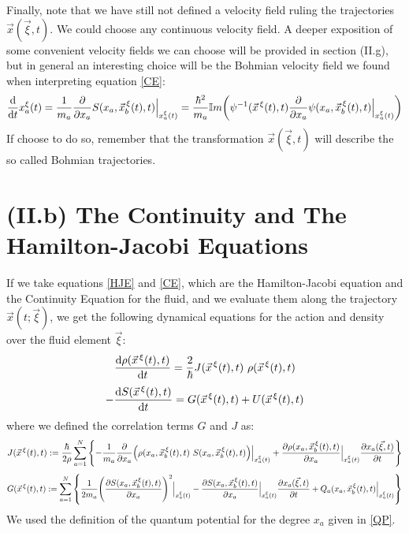\documentclass[11pt, a4paper]{article} %
\begin{document}
Finally, note that we have still not defined a velocity field ruling the trajectories $\vec{x}(\vec{\xi},t)$. We could choose any continuous velocity field. A deeper exposition of some convenient velocity fields we can choose will be provided in section (II.g), but in general an interesting choice will be the Bohmian velocity field we found when interpreting equation \eqref{CE}:
\begin{equation}\label{ImpBohm}
\dv{}{t}x_a^\xi(t)=\frac{1}{m_a}\pdv{}{x_a}S(x_a, \vec{x}_b^{\, \xi}(t),t)\Big\rvert_{x^\xi_a(t)}=\frac{\hbar^2}{m_a}\mathbb{I}m \qty( \psi^{-1}(\vec{x}^{\, \xi}(t),t)\pdv{}{x_a}\psi(x_a, \vec{x}_b^{\, \xi}(t),t)\Big\rvert_{x^\xi_a(t)})
\end{equation}
 If choose to do so, remember that the transformation $\vec{x}(\vec{\xi},t)$ will describe the so called Bohmian trajectories.
\newpage
\section*{(II.b) The Continuity and The Hamilton-Jacobi Equations\vspace{-0.3cm}}

If we take equations \eqref{HJE} and \eqref{CE}, which are the Hamilton-Jacobi equation and the Continuity Equation for the fluid, and we evaluate them along the trajectory $\vec{x}(t;\vec{\xi})$, we get the following dynamical equations for the action and density over the fluid element $\vec{\xi}$:
\begin{equation}\label{CE.L}
\dv{\rho(\vec{x}^{\, \xi}(t),t)}{t}=\frac{2}{\hbar}J(\vec{x}^{\, \xi}(t),t)\ \rho(\vec{x}^{\, \xi}(t),t)
\end{equation}
\begin{equation}\label{HJE.L}
-\dv{S(\vec{x}^{\, \xi}(t),t)}{t}=G(\vec{x}^{\, \xi}(t),t)+U(\vec{x}^{\, \xi}(t),t)
\end{equation}
where we defined the correlation terms $G$ and $J$ as:
\begin{equation}\label{JL}
J(\vec{x}^{\, \xi}(t),t):=\frac{\hbar}{2\rho}\sum_{a=1}^N\qty{-\frac{1}{m_a}\pdv{}{x_a}\qty(\rho(x_a, \vec{x}_b^{\, \xi}(t),t)\ S(x_a, \vec{x}_b^{\, \xi}(t),t))\Big\rvert_{x_a^\xi(t)}+\pdv{\rho(x_a, \vec{x}_b^{\, \xi}(t),t)}{x_a}\Big\rvert_{x_a^\xi(t)}\pdv{x_a(\vec{\xi},t)}{t}}
\end{equation}
\begin{equation}\label{GL}
G(\vec{x}^{\, \xi}(t),t):=\sum_{a=1}^N\qty{\frac{1}{2m_a}\qty(\pdv{S(x_a, \vec{x}_b^{\, \xi}(t),t)}{x_a})^2\Big\rvert_{x_a^\xi(t)}-\pdv{S(x_a, \vec{x}_b^{\, \xi}(t),t)}{x_a}\Big\rvert_{x_a^\xi(t)}\pdv{x_a(\vec{\xi},t)}{t}+Q_a(x_a, \vec{x}_b^{\, \xi}(t),t)\Big\rvert_{x_a^\xi(t)}}\vspace{-0.1cm}
\end{equation}
We used the definition of the quantum potential for the degree $x_a$ given in \eqref{QP}.
\end{document}
